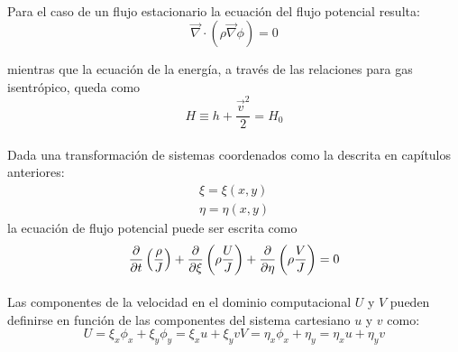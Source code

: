 \documentclass[letterpaper, openright, 12pt]{book}
\begin{document}
    \paragraph*{}
        Para el caso de un flujo estacionario la ecuación del flujo potencial
        resulta:
        \begin{equation}
            \vec{\nabla} \cdot \left( \rho \vec{\nabla} \phi \right) = 0
            \label{stationary_flow}
        \end{equation}

        mientras que la ecuación de la energía, a través de las relaciones
        para gas isentrópico, queda como
        \begin{equation}
            H \equiv h + \frac{\vec{v}^2}{2} = H_0
        \end{equation}

    \paragraph*{}
        Dada una transformación de sistemas coordenados como la descrita en
        capítulos anteriores:
        \begin{align*}
            \xi = \xi(x, y)
            \\
            \eta = \eta(x, y)
        \end{align*}
        la ecuación de flujo potencial puede ser escrita como
        \begin{equation}
            \pdv{t} \left( \frac{\rho}{J} \right) + \pdv{\xi} \left( \rho
                    \frac{U}{J} \right) + \pdv{\eta} \left( \rho \frac{V}{J}
                        \right) = 0
            \label{eq_potencial_0}
        \end{equation}

    \paragraph*{}
        Las componentes de la velocidad en el dominio computacional $U$ y $V$
        pueden definirse en función de las componentes del sistema cartesiano
        $u$ y $v$ como:
        \begin{subequations}
            \begin{equation}
                U = \xi_{x} \phi_{x} + \xi_{y} \phi_{y}
                        = \xi_{x} u + \xi_{y} v
            \end{equation}
            \begin{equation}
                V = \eta_{x} \phi_{x} + \eta_{y} = \eta_{x} u + \eta_{y} v
            \end{equation}
        \end{subequations}
\end{document}
